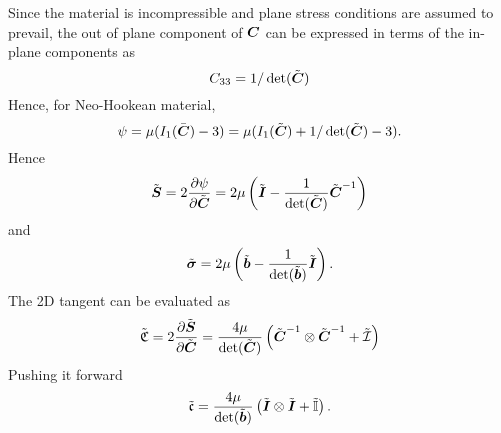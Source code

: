 \documentclass[11pt,twoside,TimesRoman]{article}
\newcommand{\parder}[2]{{\dfrac{\partial #1}{\partial #2}}}
\begin{document}
Since the material is incompressible and plane stress conditions are assumed to prevail, the out of plane component of $\mbox{\boldmath $C$}$ can be expressed in terms of the in-plane components as 
\begin{equation}
	C_{33} = 1/\det(\tilde{\mbox{\boldmath $C$}})
\end{equation}
Hence, for Neo-Hookean material,
\begin{equation}
	\psi = \mu (I_1(\bar{\mbox{\boldmath $C$}})-3) = \mu (I_1(\tilde{\mbox{\boldmath $C$}})+1/\det(\tilde{\mbox{\boldmath $C$}})-3).
\end{equation}
Hence
\begin{equation}
	\bfStilde = 2\parder{\psi}{\bfCtilde} = 2\mu \left(\bfItilde -\frac{1}{\det(\bfCtilde)} \bfCtilde^{-1} \right)
\end{equation}
and 
\begin{equation}
\tilde{\mbox{\boldmath $\sigma$}} = 2\mu \left(\tilde{\mbox{\boldmath $b$}} -\frac{1}{\det(\tilde{\mbox{\boldmath $b$}})} \tilde{\mbox{\boldmath $I$}} \right).
\end{equation}
The 2D tangent can be evaluated as
\begin{equation}
	\tilde{\mathfrak{C}} = 2\parder{\bfStilde}{\bfCtilde} = \frac{4\mu}{\det(\bfCtilde)} \left( \bfCtilde^{-1} \otimes \bfCtilde^{-1} + \tilde{\mathcal{I}} \right)
\end{equation}
Pushing it forward
\begin{equation}
	\tilde{\mathfrak{c}} = \frac{4\mu}{\det(\tilde{\mbox{\boldmath $b$}})} \left( \tilde{\mbox{\boldmath $I$}} \otimes \tilde{\mbox{\boldmath $I$}} + \tilde{\mathbb{I}} \right).
\end{equation}
\end{document}
